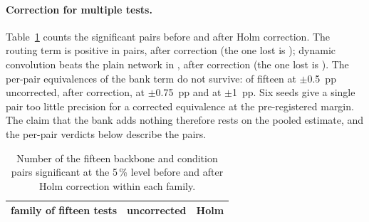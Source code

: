 \documentclass[10pt,a4paper]{article}
\begin{document}
\paragraph{Correction for multiple tests.} Table~\ref{tab:mult} counts the
significant pairs before and after Holm correction. The routing term is
positive in  pairs,  after correction (the
one lost is ); dynamic convolution beats the plain network
in ,  after correction (the one lost is
). The per-pair equivalences of the bank term do not
survive:  of fifteen at $\pm$\SI{0.5}{pp} uncorrected,
 after correction,  at
$\pm$\SI{0.75}{pp} and  at $\pm$\SI{1}{pp}. Six seeds give
a single pair too little precision for a corrected equivalence at the
pre-registered margin. The claim that the bank adds nothing therefore rests
on the pooled estimate, and the per-pair verdicts below describe the
pairs.

\begin{table}[!htbp]\centering\small
\caption{Pooled bank and routing terms (pp). The first row pools the
fifteen backbone and condition pairs with random effects; the others pool
the five conditions of one backbone with fixed weights. Equivalence at a
margin $\delta$ holds when the \SI{90}{\percent} interval lies inside
$\pm\delta$.}
\label{tab:pool}
\end{table}

\begin{table}[!htbp]\centering\small
\caption{Number of the fifteen backbone and condition pairs significant at
the 5\,\% level before and after Holm correction within each family.}
\label{tab:mult}
\begin{tabular}{l rr}
\toprule
family of fifteen tests & uncorrected & Holm \\
\midrule
\bottomrule
\end{tabular}
\end{table}
\end{document}
